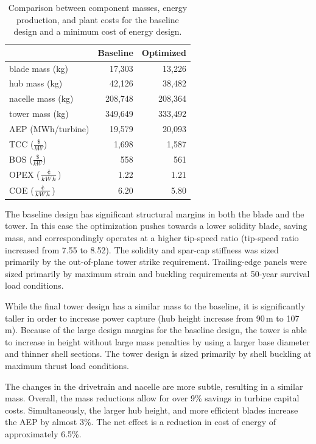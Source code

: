 \documentclass[]{aiaa-tc} %
\newcommand{\cent}{{\mathrm{c}\mkern-6.5mu{\mid}}}
\begin{document}
    \begin{table}[htb]
    \centering
    \caption{Comparison between component masses, energy production, and plant costs for the baseline design and a minimum cost of energy design.}
    \label{tab:wind_results}
    \begin{tabular}{@{}lrr@{}}
    \toprule
     &  Baseline & Optimized  \\
    \midrule
    blade mass (kg) & 17,303 & 13,226  \\
    hub mass (kg) & 42,126 & 38,482  \\
    nacelle mass (kg) & 208,748 & 208,364  \\
    tower mass (kg) & 349,649 & 333,492  \\
    AEP (MWh/turbine) &  19,579 & 20,093  \\
    TCC ($\frac{\$}{kW}$) &  1,698 & 1,587  \\
    BOS ($\frac{\$}{kW}$) &  558 & 561  \\
    OPEX ($\frac{\cent}{kWh}$) &  1.22 & 1.21  \\
    COE ($\frac{\cent}{kWh}$) &  6.20 & 5.80  \\
    \bottomrule
    \end{tabular}
    \end{table}

      The baseline design has significant structural margins in both the blade and the tower.  In this case the optimization pushes towards a lower solidity blade, saving mass, and correspondingly operates at a higher tip-speed ratio (tip-speed ratio increased from 7.55 to 8.52).  The solidity and spar-cap stiffness was sized primarily by the out-of-plane tower strike requirement.  Trailing-edge panels were sized primarily by maximum strain and buckling requirements at 50-year survival load conditions.

      While the final tower design has a similar mass to the baseline, it is significantly taller in order to increase power capture (hub height increase from 90\,m to 107\,m).  Because of the large design margins for the baseline design, the tower is able to increase in height without large mass penalties by using a larger base diameter and thinner shell sections.  The tower design is sized primarily by shell buckling at maximum thrust load conditions.

      The changes in the drivetrain and nacelle are more subtle, resulting in a similar mass.  Overall, the mass reductions allow for over 9\% savings in turbine capital costs.  Simultaneously, the larger hub height, and more efficient blades increase the AEP by almost 3\%.  The net effect is a reduction in cost of energy of approximately 6.5\%.
\end{document}
